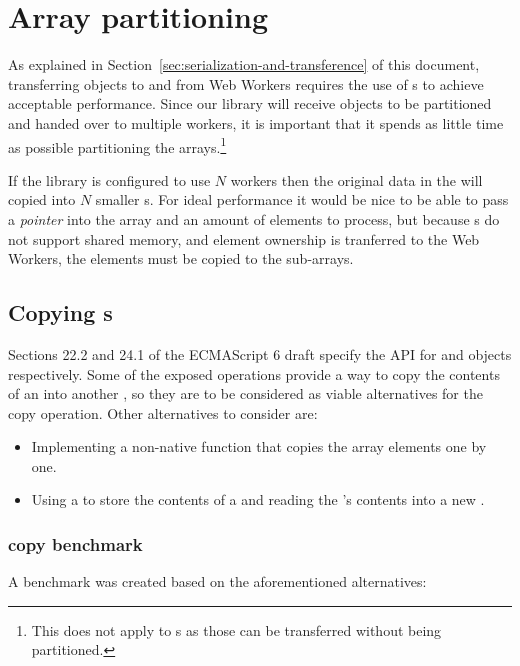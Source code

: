 \section{Array partitioning}

As explained in Section~\ref{sec:serialization-and-transference} of this document, transferring \ttarray{} objects to and from Web Workers requires the use of s to achieve acceptable performance. Since our library will receive \ttarray{} objects to be partitioned and handed over to multiple workers, it is important that it spends as little time as possible partitioning the arrays.\footnote{This does not apply to \tstarray{}s as those can be transferred without being partitioned.}

If the library is configured to use \(N\) workers then the original data in the \ttarray{} will copied into \(N\) smaller \ttarray{}s. For ideal performance it would be nice to be able to pass a \textit{pointer} into the array and an amount of elements to process, but because \ttarray{}s do not support shared memory, and element ownership is tranferred to the Web Workers, the elements must be copied to the sub-arrays.

\subsection{Copying \ttarray{}s}
\label{subsec:copying-typed-arrays}
Sections 22.2 and 24.1 of the ECMAScript 6 draft \cite{es6} specify the API for \ttarray{} and \tabuffer{} objects respectively. Some of the exposed operations provide a way to copy the contents of an \tabuffer{} into another \tabuffer{}, so they are to be considered as viable alternatives for the copy operation. Other alternatives to consider are:
\begin{itemize}
  \item Implementing a non-native function that copies the array elements one by one.
  \item Using a  to store the contents of a \ttarray{} and reading the 's contents into a new \ttarray{}.
\end{itemize}

\subsubsection{\ttarray{} copy benchmark}
A benchmark was created based on the aforementioned alternatives:

